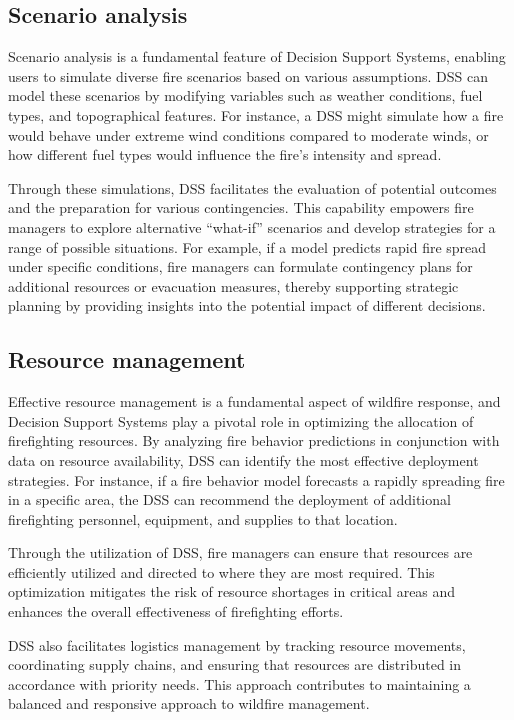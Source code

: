 \documentclass[
  12 pt,
]{Nemilov}
\begin{document}
\subsection{Scenario analysis}\label{scenario-analysis}

Scenario analysis is a fundamental feature of Decision Support Systems, enabling users to simulate diverse fire scenarios based on various assumptions. DSS can model these scenarios by modifying variables such as weather conditions, fuel types, and topographical features. For instance, a DSS might simulate how a fire would behave under extreme wind conditions compared to moderate winds, or how different fuel types would influence the fire's intensity and spread.

Through these simulations, DSS facilitates the evaluation of potential outcomes and the preparation for various contingencies. This capability empowers fire managers to explore alternative ``what-if'' scenarios and develop strategies for a range of possible situations. For example, if a model predicts rapid fire spread under specific conditions, fire managers can formulate contingency plans for additional resources or evacuation measures, thereby supporting strategic planning by providing insights into the potential impact of different decisions.

\subsection{Resource management}\label{resource-management}

Effective resource management is a fundamental aspect of wildfire response, and Decision Support Systems play a pivotal role in optimizing the allocation of firefighting resources. By analyzing fire behavior predictions in conjunction with data on resource availability, DSS can identify the most effective deployment strategies. For instance, if a fire behavior model forecasts a rapidly spreading fire in a specific area, the DSS can recommend the deployment of additional firefighting personnel, equipment, and supplies to that location.

Through the utilization of DSS, fire managers can ensure that resources are efficiently utilized and directed to where they are most required. This optimization mitigates the risk of resource shortages in critical areas and enhances the overall effectiveness of firefighting efforts.

DSS also facilitates logistics management by tracking resource movements, coordinating supply chains, and ensuring that resources are distributed in accordance with priority needs. This approach contributes to maintaining a balanced and responsive approach to wildfire management.
\end{document}
